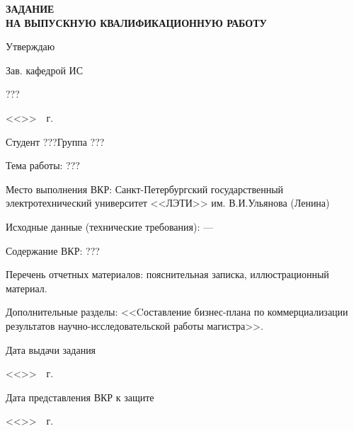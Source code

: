 \documentclass[../main]{subfiles}
\begin{document}
\newpage

\begin{titlepage}
    \centering
        
    \MakeUppercase{\bfseries\large
        задание\\
        на выпускную квалификационную работу
    }

    \vspace{2mm}

    \hfill Утверждаю

    \hfill Зав. кафедрой ИС

    \hfill {} ???

    \hfill <<\underline{\hspace{1.2cm}}>>\underline{\hspace{5cm}}~\the\year~г.

    \vspace{2mm}

    \parbox[t]{\textwidth}{
        Студент ???\hfill Группа ???

        Тема работы: ???

        Место выполнения ВКР: Санкт-Петербургский государственный электротехнический университет 
        <<ЛЭТИ>> им. В.И.Ульянова (Ленина)
        
        Исходные данные (технические требования): ---

        Содержание ВКР: ???

        Перечень отчетных материалов: пояснительная записка, иллюстрационный материал.

        Дополнительные разделы: <<Cоставление бизнес-плана по коммерциализации результатов научно-исследовательской работы магистра>>.
    }

    \vfill

    \begin{minipage}[t]{6cm}
        Дата выдачи задания

        <<\underline{\hspace{1cm}}>>\underline{\hspace{3cm}}~\the\year~г.
    \end{minipage}
    \hfill
    \begin{minipage}[t]{8cm}
        Дата представления ВКР к защите

        <<\underline{\hspace{1cm}}>>\underline{\hspace{3cm}}~\the\year~г.
    \end{minipage}
    

\end{titlepage}
\end{document}

